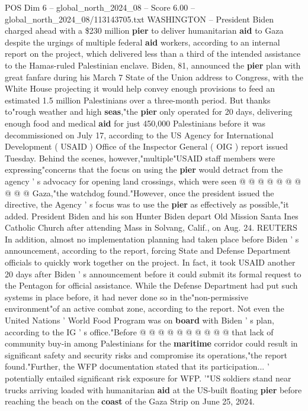 \begin{textsample}{POS Dim 6 – global\_north\_2024\_08 – Score 6.00 – global\_north\_2024\_08/113143705.txt}  \label{ex:f6_pos_373}
WASHINGTON -- President Biden charged ahead with a \$230 million \textbf{pier} to deliver humanitarian \textbf{aid} to Gaza despite the urgings of multiple federal \textbf{aid} workers, according to an internal report on the project, which delivered less than a third of the intended assistance to the Hamas-ruled Palestinian enclave.
Biden, 81, announced the \textbf{pier} plan with great fanfare during his March 7 State of the Union address to Congress, with the White House projecting it would help convey enough provisions to feed an estimated 1.5 million Palestinians over a three-month period.
But thanks to"rough weather and high \textbf{seas},"the \textbf{pier} only operated for 20 days, delivering enough food and medical \textbf{aid} for just 450,000 Palestinians before it was decommissioned on July 17, according to the US Agency for International Development ( USAID ) Office of the Inspector General ( OIG ) report issued Tuesday.
Behind the scenes, however,"multiple"USAID staff members were expressing"concerns that the focus on using the \textbf{pier} would detract from the agency ' s advocacy for opening land crossings, which were seen @ @ @ @ @ @ @ @ @ @ Gaza,"the watchdog found."However, once the president issued the directive, the Agency ' s focus was to use the \textbf{pier} as effectively as possible,"it added.
President Biden and his son Hunter Biden depart Old Mission Santa Ines Catholic Church after attending Mass in Solvang, Calif., on Aug. 24.
REUTERS In addition, almost no implementation planning had taken place before Biden ' s announcement, according to the report, forcing State and Defense Department officials to quickly work together on the project.
In fact, it took USAID another 20 days after Biden ' s announcement before it could submit its formal request to the Pentagon for official assistance.
While the Defense Department had put such systems in place before, it had never done so in the"non-permissive environment"of an active combat zone, according to the report.
Not even the United Nations ' World Food Program was on \textbf{board} with Biden ' s plan, according to the IG ' s office."Before @ @ @ @ @ @ @ @ @ @ that lack of community buy-in among Palestinians for the \textbf{maritime} corridor could result in significant safety and security risks and compromise its operations,"the report found."Further, the WFP documentation stated that its participation... ' potentially entailed significant risk exposure for WFP. '"US soldiers stand near trucks arriving loaded with humanitarian \textbf{aid} at the US-built floating \textbf{pier} before reaching the beach on the \textbf{coast} of the Gaza Strip on June 25, 2024.

\end{textsample}
